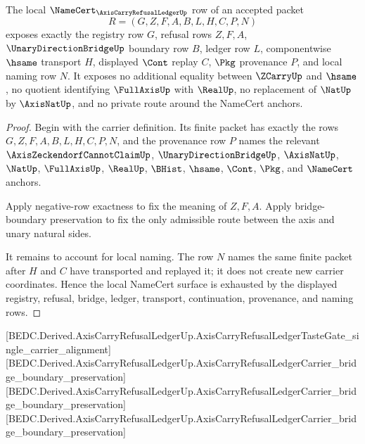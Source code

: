 \begin{theorem}
\label{thm:axis-carry-refusal-ledger-local-namecert-exhaustion}
The local $\NameCert_{\AxisCarryRefusalLedgerUp}$ row of an accepted packet
$$
R=(G,Z,F,A,B,L,H,C,P,N)
$$
exposes exactly the registry row $G$, refusal rows $Z,F,A$, $\UnaryDirectionBridgeUp$ boundary row $B$, ledger row $L$, componentwise $\hsame$ transport $H$, displayed $\Cont$ replay $C$, $\Pkg$ provenance $P$, and local naming row $N$. It exposes no additional equality between $\ZCarryUp$ and $\hsame$, no quotient identifying $\FullAxisUp$ with $\RealUp$, no replacement of $\NatUp$ by $\AxisNatUp$, and no private route around the NameCert anchors.
\end{theorem}
\begin{proof}
Begin with the carrier definition. Its finite packet has exactly the rows $G,Z,F,A,B,L,H,C,P,N$, and the provenance row $P$ names the relevant $\AxisZeckendorfCannotClaimUp$, $\UnaryDirectionBridgeUp$, $\AxisNatUp$, $\NatUp$, $\FullAxisUp$, $\RealUp$, $\BHist$, $\hsame$, $\Cont$, $\Pkg$, and $\NameCert$ anchors.

Apply negative-row exactness to fix the meaning of $Z,F,A$. Apply bridge-boundary preservation to fix the only admissible route between the axis and unary natural sides.

It remains to account for local naming. The row $N$ names the same finite packet after $H$ and $C$ have transported and replayed it; it does not create new carrier coordinates. Hence the local NameCert surface is exhausted by the displayed registry, refusal, bridge, ledger, transport, continuation, provenance, and naming rows.
\end{proof}

[BEDC.Derived.AxisCarryRefusalLedgerUp.AxisCarryRefusalLedgerTasteGate\_single\_carrier\_alignment]
[BEDC.Derived.AxisCarryRefusalLedgerUp.AxisCarryRefusalLedgerCarrier\_bridge\_boundary\_preservation]
[BEDC.Derived.AxisCarryRefusalLedgerUp.AxisCarryRefusalLedgerCarrier\_bridge\_boundary\_preservation]
[BEDC.Derived.AxisCarryRefusalLedgerUp.AxisCarryRefusalLedgerCarrier\_bridge\_boundary\_preservation]

